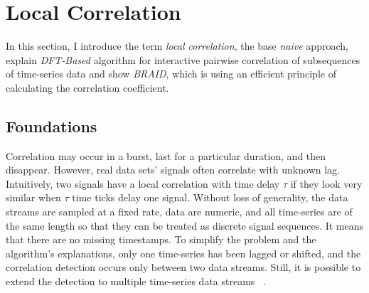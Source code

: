 \section{Local Correlation}
\label{sec:3}
In this section, I introduce the term \textit{local correlation}, the base \textit{naive} approach, explain \textit{DFT-Based} algorithm for interactive pairwise correlation of subsequences of time-series data and show \textit{BRAID}, which is using an efficient principle of calculating the correlation coefficient.
\subsection{Foundations}
Correlation may occur in a burst, last for a particular duration, and then disappear. However, real data sets' signals often correlate with unknown lag. Intuitively, two signals have a local correlation with time delay $\tau$ if they look very similar when $\tau$ time ticks delay one signal. Without loss of generality, the data streams are sampled at a fixed rate, data are numeric, and all time-series are of the same length so that they can be treated as discrete signal sequences. It means that there are no missing timestamps. To simplify the problem and the algorithm's explanations, only one time-series has been lagged or shifted, and the correlation detection occurs only between two data streams. Still, it is possible to extend the detection to multiple time-series data streams ~\cite{ref18}. \newline

